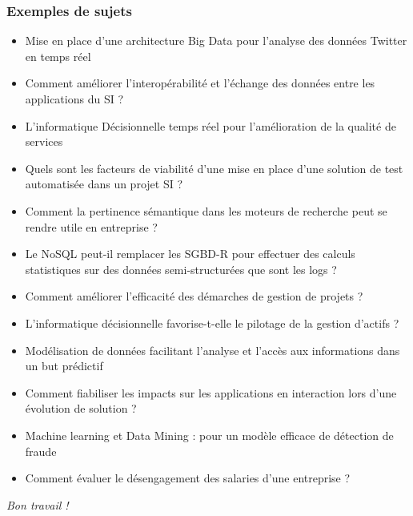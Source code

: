 \documentclass[french]{beamer}
\begin{document}
\begin{frame}[allowframebreaks]
	\frametitle{Exemples de sujets}
	\begin{itemize}
		\item Mise en place d’une architecture Big Data pour l’analyse des données Twitter en temps réel
   \item Comment améliorer l’interopérabilité et l’échange des données entre les applications du SI ?
   \item L’informatique Décisionnelle temps réel pour l’amélioration de la qualité de services
   \item Quels sont les facteurs de viabilité d’une mise en place d’une solution de test automatisée dans un projet SI ?
   \item Comment la pertinence sémantique dans les moteurs de recherche peut se rendre utile en entreprise ?  
   \item Le NoSQL peut-il remplacer les SGBD-R pour effectuer des calculs statistiques sur des données semi-structurées que sont les logs ?
   \item Comment améliorer l’efficacité des démarches de gestion de projets ? 
   \item L’informatique décisionnelle favorise-t-elle le pilotage de la gestion d’actifs ?
   \item Modélisation de données facilitant l’analyse et l’accès aux informations dans un but prédictif
   \item Comment fiabiliser les impacts sur les applications en interaction lors d’une évolution de solution ? 
   \item Machine learning et Data Mining : pour un modèle efficace de détection de fraude
   \item Comment évaluer le désengagement des salaries d’une entreprise ? 
	\end{itemize}
\end{frame} 

\begin{frame}[plain]
	\addtocounter{framenumber}{-1}
	\begin{center}
		\huge
		\textit{Bon travail !}
	\end{center}
\end{frame}
\end{document}
